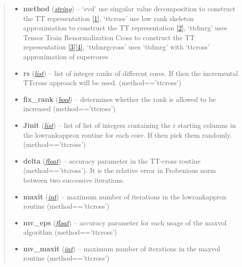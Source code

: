\documentclass[a4paper,10pt,english]{sphinxmanual}
\begin{document}
\begin{fulllineitems}
\begin{fulllineitems}
\begin{quote}
\begin{description}
\begin{itemize}
\item {} 
\textbf{method} (\href{http://docs.python.org/library/string.html\#module-string}{\emph{string}}) -- `svd' use singular value decomposition to construct the TT representation {\hyperref[zrefs:oseledets2011]{{[}1{]}}}, `ttcross' use low rank skeleton approximation to construct the TT representation {\hyperref[zrefs:oseledets2010]{{[}2{]}}}, `ttdmrg' uses Tensor Train Renormalization Cross to construct the TT representation {\hyperref[zrefs:savostyanov2011]{{[}3{]}}}{\hyperref[zrefs:savostyanov2013]{{[}4{]}}}, `ttdmrgcross' uses `ttdmrg' with `ttcross' approximation of supercores

\item {} 
\textbf{rs} (\href{http://docs.python.org/library/functions.html\#list}{\emph{list}}) -- list of integer ranks of different cores. If  then the incremental TTcross approach will be used. (method=='ttcross')

\item {} 
\textbf{fix\_rank} (\href{http://docs.python.org/library/functions.html\#bool}{\emph{bool}}) -- determines whether the rank is allowed to be increased (method=='ttcross')

\item {} 
\textbf{Jinit} (\href{http://docs.python.org/library/functions.html\#list}{\emph{list}}) -- list of list of integers containing the r starting columns in the lowrankapprox routine for each core. If  then pick them randomly. (method=='ttcross')

\item {} 
\textbf{delta} (\href{http://docs.python.org/library/functions.html\#float}{\emph{float}}) -- accuracy parameter in the TT-cross routine (method=='ttcross'). It is the relative error in Frobenious norm between two successive iterations.

\item {} 
\textbf{maxit} (\href{http://docs.python.org/library/functions.html\#int}{\emph{int}}) -- maximum number of iterations in the lowrankapprox routine (method=='ttcross')

\item {} 
\textbf{mv\_eps} (\href{http://docs.python.org/library/functions.html\#float}{\emph{float}}) -- accuracy parameter for each usage of the maxvol algorithm (method=='ttcross')

\item {} 
\textbf{mv\_maxit} (\href{http://docs.python.org/library/functions.html\#int}{\emph{int}}) -- maximum number of iterations in the maxvol routine (method=='ttcross')


\end{itemize}
\end{description}
\end{quote}
\end{fulllineitems}
\end{fulllineitems}
\end{document}
